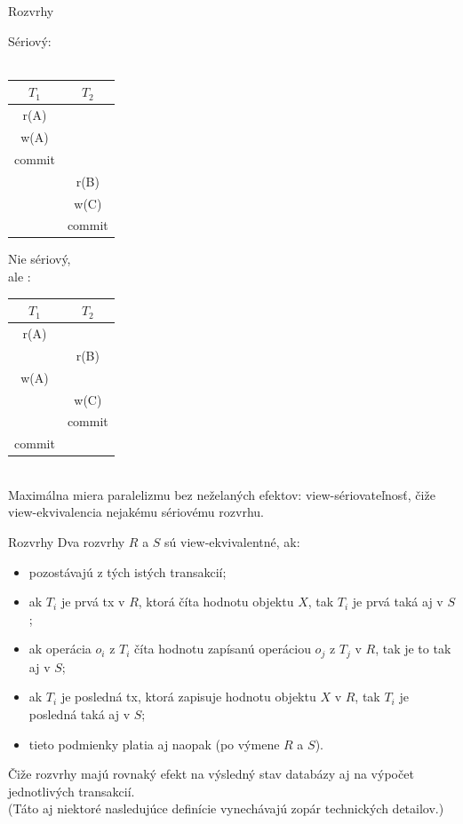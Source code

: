 \documentclass[12pt]{beamer}
\begin{document}
\begin{frame}[fragile]{Rozvrhy}
\begin{minipage}{.4\pdfpagewidth}
\alert{Sériový}:\\
\\[5mm]
\begin{tabular}{c|c}
  $T_1$  & $T_2$  \\\hline\hline
  r(A)   &        \\\hline
  w(A)   &        \\\hline
  commit &        \\\hline
         & r(B)   \\\hline
         & w(C)   \\\hline
         & commit \\
\end{tabular}
\end{minipage}
\begin{minipage}{.4\pdfpagewidth}
Nie sériový,\\
ale :\\[5mm]
\begin{tabular}{c|c}
  $T_1$  & $T_2$  \\\hline\hline
  r(A)   &        \\\hline
         & r(B)   \\\hline
  w(A)   &        \\\hline
         & w(C)   \\\hline
         & commit \\\hline
  commit &        \\
\end{tabular}
\end{minipage}
\\[5mm]
Maximálna miera paralelizmu bez neželaných efektov: \alert{view-sériovateľnosť},
čiže \alert{view-ekvivalencia} nejakému sériovému rozvrhu.
\end{frame}


\begin{frame}[fragile]{Rozvrhy}
Dva rozvrhy $R$ a $S$ sú \alert{view-ekvivalentné}, ak:
\begin{itemize}
\item pozostávajú z tých istých transakcií;
\item ak $T_i$ je prvá tx v $R$, ktorá číta hodnotu objektu $X$, tak $T_i$ je prvá taká aj v $S$;
\item ak operácia $o_i$ z $T_i$ číta hodnotu zapísanú operáciou $o_j$ z $T_j$ v $R$, tak je to tak aj v $S$;
\item ak $T_i$ je posledná tx, ktorá zapisuje hodnotu objektu $X$ v $R$, tak $T_i$ je posledná taká aj v $S$;
\item tieto podmienky platia aj naopak (po výmene $R$ a $S$).
\end{itemize}
Čiže rozvrhy majú rovnaký efekt na výsledný stav databázy aj na výpočet jednotlivých transakcií.\\
\scriptsize{(Táto aj niektoré nasledujúce definície vynechávajú zopár technických detailov.)}
\end{frame}
\end{document}
